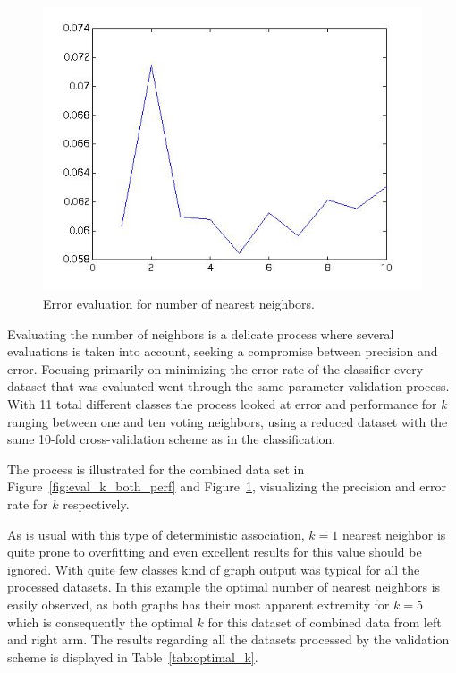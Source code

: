 \documentclass{sig-alternate}
\begin{document}
\begin{figure}
\begin{center}
\includegraphics[width=0.6\linewidth]{visual_results/evaluate_k_both_loss_pred_error.jpg}
\end{center}
\caption{Error evaluation for number of nearest neighbors.}
\label{fig:eval_k_both_error}
\end{figure}

Evaluating the number of neighbors is a delicate process where several evaluations is taken into account, seeking a compromise between precision and error. Focusing primarily on minimizing the error rate of the classifier every dataset that was evaluated went through the same parameter validation process. With 11 total different classes the process looked at error and performance for $k$ ranging between one and ten voting neighbors, using a reduced dataset with the same 10-fold cross-validation scheme as in the classification.

The process is illustrated for the combined data set in Figure~\ref{fig:eval_k_both_perf} and Figure~\ref{fig:eval_k_both_error}, visualizing the precision and error rate for $k$ respectively. 

As is usual with this type of deterministic association, $k=1$ nearest neighbor is quite prone to overfitting and even excellent results for this value should be ignored. With quite few classes kind of graph output was typical for all the processed datasets. In this example the optimal number of nearest neighbors is easily observed, as both graphs has their most apparent extremity for $k=5$ which is consequently the optimal $k$ for this dataset of combined data from left and right arm. The results regarding all the datasets processed by the validation scheme is displayed in Table~\ref{tab:optimal_k}.
\end{document}
